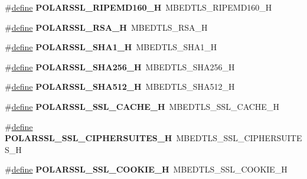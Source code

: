 \begin{DoxyCompactItemize}
\#\hyperlink{structdefine}{define} {\bfseries P\+O\+L\+A\+R\+S\+S\+L\+\_\+\+R\+I\+P\+E\+M\+D160\+\_\+H}~M\+B\+E\+D\+T\+L\+S\+\_\+\+R\+I\+P\+E\+M\+D160\+\_\+H
\item 
\mbox{\label{compat-1_83_8h_a78e2dfb2ede2ea44d104a85de29b0eb7}} 
\#\hyperlink{structdefine}{define} {\bfseries P\+O\+L\+A\+R\+S\+S\+L\+\_\+\+R\+S\+A\+\_\+H}~M\+B\+E\+D\+T\+L\+S\+\_\+\+R\+S\+A\+\_\+H
\item 
\mbox{\label{compat-1_83_8h_ab55bf46ad48172d68f557ede123c2c16}} 
\#\hyperlink{structdefine}{define} {\bfseries P\+O\+L\+A\+R\+S\+S\+L\+\_\+\+S\+H\+A1\+\_\+H}~M\+B\+E\+D\+T\+L\+S\+\_\+\+S\+H\+A1\+\_\+H
\item 
\mbox{\label{compat-1_83_8h_a202dd3f48da5d32f4ff577352cbd7774}} 
\#\hyperlink{structdefine}{define} {\bfseries P\+O\+L\+A\+R\+S\+S\+L\+\_\+\+S\+H\+A256\+\_\+H}~M\+B\+E\+D\+T\+L\+S\+\_\+\+S\+H\+A256\+\_\+H
\item 
\mbox{\label{compat-1_83_8h_acf35986f2a001db507be60183c87f9e1}} 
\#\hyperlink{structdefine}{define} {\bfseries P\+O\+L\+A\+R\+S\+S\+L\+\_\+\+S\+H\+A512\+\_\+H}~M\+B\+E\+D\+T\+L\+S\+\_\+\+S\+H\+A512\+\_\+H
\item 
\mbox{\label{compat-1_83_8h_aece1c1276266697c379a684ac238a98d}} 
\#\hyperlink{structdefine}{define} {\bfseries P\+O\+L\+A\+R\+S\+S\+L\+\_\+\+S\+S\+L\+\_\+\+C\+A\+C\+H\+E\+\_\+H}~M\+B\+E\+D\+T\+L\+S\+\_\+\+S\+S\+L\+\_\+\+C\+A\+C\+H\+E\+\_\+H
\item 
\mbox{\label{compat-1_83_8h_ae147fcb915f29d083d09176982c3026c}} 
\#\hyperlink{structdefine}{define} {\bfseries P\+O\+L\+A\+R\+S\+S\+L\+\_\+\+S\+S\+L\+\_\+\+C\+I\+P\+H\+E\+R\+S\+U\+I\+T\+E\+S\+\_\+H}~M\+B\+E\+D\+T\+L\+S\+\_\+\+S\+S\+L\+\_\+\+C\+I\+P\+H\+E\+R\+S\+U\+I\+T\+E\+S\+\_\+H
\item 
\mbox{\label{compat-1_83_8h_a7978e5c11b25fb5b967f122985f721b6}} 
\#\hyperlink{structdefine}{define} {\bfseries P\+O\+L\+A\+R\+S\+S\+L\+\_\+\+S\+S\+L\+\_\+\+C\+O\+O\+K\+I\+E\+\_\+H}~M\+B\+E\+D\+T\+L\+S\+\_\+\+S\+S\+L\+\_\+\+C\+O\+O\+K\+I\+E\+\_\+H
\item 
\mbox{\label{compat-1_83_8h_ac3ad711afad5d44692f938326f7730b5}} 

\end{DoxyCompactItemize}
